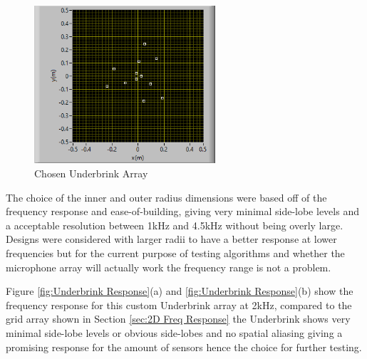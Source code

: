 \documentclass{UoNMCHA}
\numberwithin{equation}{section}
\begin{document}
    \begin{figure} [H]
        \centering
        \includegraphics[keepaspectratio, width = 0.6\textwidth]{Figures/CurrentTestingArray.png}
        \caption{Chosen Underbrink Array}
        \label{fig:Testing Array}
    \end{figure}
    
    The choice of the inner and outer radius dimensions were based off of the frequency response and ease-of-building, giving very minimal side-lobe levels and a acceptable resolution between 1kHz and 4.5kHz without being overly large. Designs were considered with larger radii to have a better response at lower frequencies but for the current purpose of testing algorithms and whether the microphone array will actually work the frequency range is not a problem.
    
    Figure \ref{fig:Underbrink Response}(a) and \ref{fig:Underbrink Response}(b) show the frequency response for this custom Underbrink array at 2kHz, compared to the grid array shown in Section \ref{sec:2D Freq Response} the Underbrink shows very minimal side-lobe levels or obvious side-lobes and no spatial aliasing giving a promising response for the amount of sensors hence the choice for further testing.  
\end{document}
